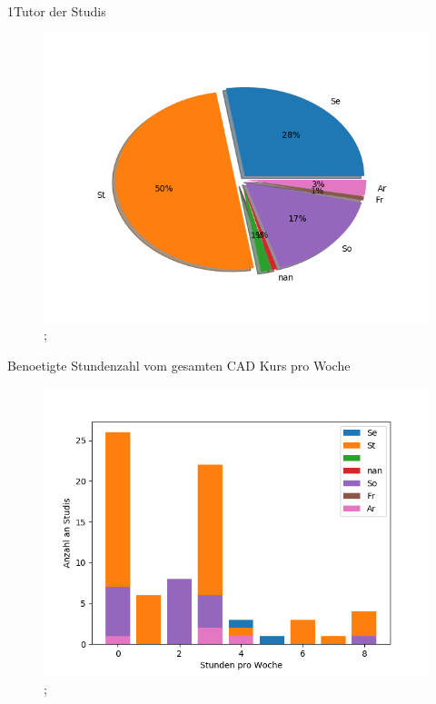 \documentclass[10pt]{beamer}
\begin{document}
\begin{frame}[fragile]{1Tutor der Studis} 
 \begin{figure}
 \includegraphics[width= 0.9\linewidth]{./PDFcreater/Plots/SolidEdge/1Tutor+der+Studis.png};
 \end{figure}
 \end{frame}
\begin{frame}[fragile]{Benoetigte Stundenzahl vom gesamten CAD Kurs pro Woche} 
 \begin{figure}
 \includegraphics[width= 0.9\linewidth]{./PDFcreater/Plots/SolidEdge/Benoetigte+Stundenzahl+vom+gesamten+CAD+Kurs+pro+Woche.png};
 \end{figure}
 \end{frame}
\end{document}
